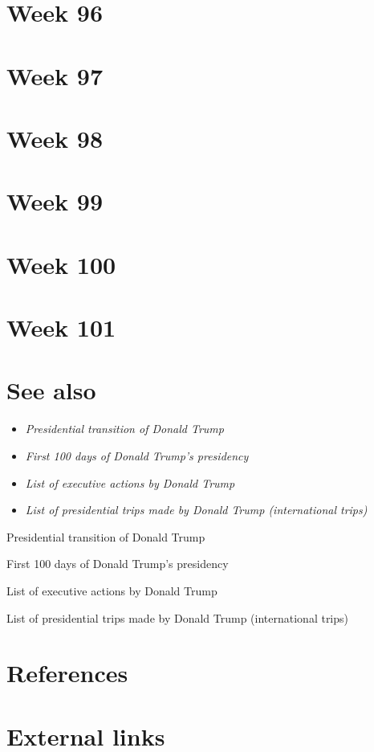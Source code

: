 \section{Week 96}\label{week-96-1}

\section{Week 97}\label{week-97}

\section{Week 98}\label{week-98}

\section{Week 99}\label{week-99}

\section{Week 100}\label{week-100}

\section{Week 101}\label{week-101}

\section{See also}\label{see-also}

\begin{itemize}
\item
  \emph{Presidential transition of Donald Trump}
\item
  \emph{First 100 days of Donald Trump's presidency}
\item
  \emph{List of executive actions by Donald Trump}
\item
  \emph{List of presidential trips made by Donald Trump (international
  trips)}
\end{itemize}

Presidential transition of Donald Trump

First 100 days of Donald Trump's presidency

List of executive actions by Donald Trump

List of presidential trips made by Donald Trump (international trips)

\section{References}\label{references}

\section{External links}\label{external-links}
